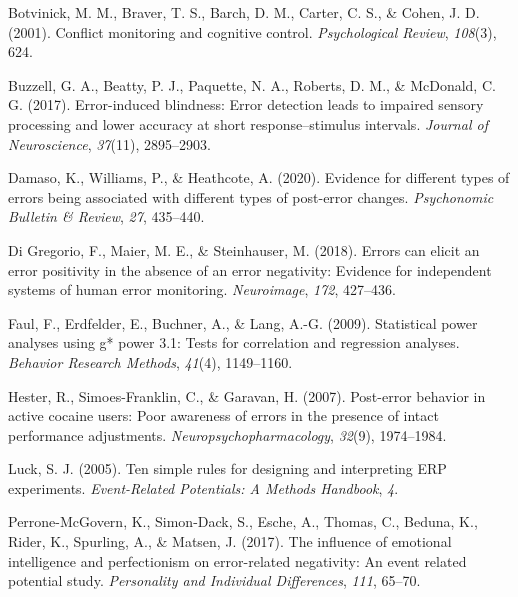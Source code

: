 \documentclass[
  man,floatsintext]{apa7}
\newlength{\cslhangindent}
\newlength{\cslentryspacingunit} %
\newenvironment{CSLReferences}[2] %
 {%
  \setlength{\parindent}{0pt}
  \ifodd #1
  \let\oldpar\par
  \def\par{\hangindent=\cslhangindent\oldpar}
  \fi
  \setlength{\parskip}{#2\cslentryspacingunit}
 }%
 {}
\begin{document}
\hypertarget{refs}{}
\begin{CSLReferences}{1}{0}
\leavevmode{}%
Botvinick, M. M., Braver, T. S., Barch, D. M., Carter, C. S., \& Cohen, J. D. (2001). Conflict monitoring and cognitive control. \emph{Psychological Review}, \emph{108}(3), 624.

\leavevmode{}%
Buzzell, G. A., Beatty, P. J., Paquette, N. A., Roberts, D. M., \& McDonald, C. G. (2017). Error-induced blindness: Error detection leads to impaired sensory processing and lower accuracy at short response--stimulus intervals. \emph{Journal of Neuroscience}, \emph{37}(11), 2895--2903.

\leavevmode{}%
Damaso, K., Williams, P., \& Heathcote, A. (2020). Evidence for different types of errors being associated with different types of post-error changes. \emph{Psychonomic Bulletin \& Review}, \emph{27}, 435--440.

\leavevmode{}%
Di Gregorio, F., Maier, M. E., \& Steinhauser, M. (2018). Errors can elicit an error positivity in the absence of an error negativity: Evidence for independent systems of human error monitoring. \emph{Neuroimage}, \emph{172}, 427--436.

\leavevmode{}%
Faul, F., Erdfelder, E., Buchner, A., \& Lang, A.-G. (2009). Statistical power analyses using g* power 3.1: Tests for correlation and regression analyses. \emph{Behavior Research Methods}, \emph{41}(4), 1149--1160.

\leavevmode{}%
Hester, R., Simoes-Franklin, C., \& Garavan, H. (2007). Post-error behavior in active cocaine users: Poor awareness of errors in the presence of intact performance adjustments. \emph{Neuropsychopharmacology}, \emph{32}(9), 1974--1984.

\leavevmode{}%
Luck, S. J. (2005). Ten simple rules for designing and interpreting ERP experiments. \emph{Event-Related Potentials: A Methods Handbook}, \emph{4}.

\leavevmode{}%
Perrone-McGovern, K., Simon-Dack, S., Esche, A., Thomas, C., Beduna, K., Rider, K., Spurling, A., \& Matsen, J. (2017). The influence of emotional intelligence and perfectionism on error-related negativity: An event related potential study. \emph{Personality and Individual Differences}, \emph{111}, 65--70.

\end{CSLReferences}
\end{document}
